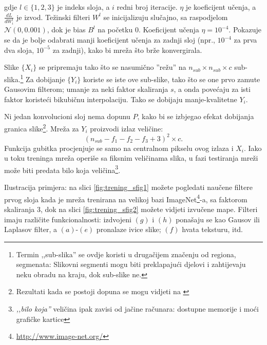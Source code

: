 \documentclass[12pt]{report}
\numberwithin{equation}{section}
\begin{document}
gdje $l \in \{ 1, 2, 3 \}$ je indeks sloja, a $i$ redni broj iteracije. $\eta$ je koeficijent učenja, a $\frac{dL}{dW_i^l}$ je izvod. Težinski filteri ${W^l}$ se inicijalizuju slučajno, sa raspodjelom $\mathcal{N}(0, 0.001)$, dok je bias ${B^l}$ na početku $0$. Koeficijent učenja $\eta = 10^{-4}$. Pokazuje se da je bolje odabrati manji koeficijent učenja za zadnji sloj (npr., $10^{-4}$ za prva dva sloja, $10^{-5}$ za zadnji), kako bi mreža što brže konvergirala. 

Slike $\{X_i\}$ se pripremaju tako što se nasumično ''režu'' na $n_{sub} \times n_{sub} \times c$ sub-slika.\footnote{Termin ,,sub-slika'' se ovdje koristi u drugačijem značenju od regiona, segmenata: Slikovni segmenti mogu biti preklapajući djelovi i zahtijevaju neku obradu na kraju, dok sub-slike ne.} Za dobijanje $\{Y_i\}$ koriste se iste ove sub-slike, tako što se one prvo zamute Gausovim filterom; umanje za neki faktor skaliranja $s$, a onda povećaju za isti faktor koristeći bikubičnu interpolaciju. Tako se dobijaju manje-kvalitetne ${Y_i}$. 

Ni jedan konvolucioni sloj nema dopunu $P$, kako bi se izbjegao efekat dobijanja granica slike\footnote{Rezultati kada se postoji dopuna se mogu vidjeti na \cite{samples}}. Mreža za $Y_i$ proizvodi izlaz veličine: 
\begin{equation}\label{eq:size}
(n_{sub} - f_1 - f_2 - f_3 + 3 )^2 \times c. 
\end{equation}
Funkcija gubitka procjenjuje se samo na centralnom pikselu ovog izlaza i $X_i$. Iako u toku treninga mreža operiše sa fiksnim veličinama slika, u fazi testiranja mreži može biti predata bilo koja veličina\footnote{\textit{,,bilo koja''} veličina ipak zavisi od jačine računara: dostupne memorije i moći grafičke kartice}.   

Ilustracija primjera: na slici \ref{fig:trening_sfig1} možete pogledati naučene filtere prvog sloja kada je mreža trenirana na velikoj bazi ImageNet\footnote{\url{http://www.image-net.org/}}-a, sa faktorom skaliranja 3, dok na slici  \ref{fig:trening_sfig2} možete vidjeti izvučene mape. Filteri imaju različite funkcionalnosti: izdvojeni $(g)$ i $(h)$ ponašaju se kao Gausov ili Laplasov filter, a $(a)$-$(e)$ pronalaze ivice slike; $(f)$ hvata teksturu, itd. 
\end{document}

